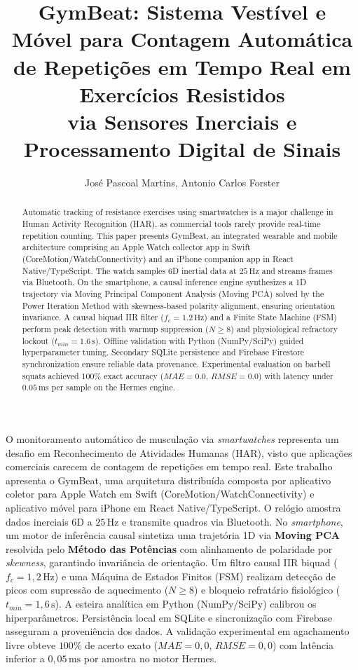 \documentclass[12pt]{article}
\title{GymBeat: Sistema Vestível e Móvel para Contagem Automática de Repetições em Tempo Real em Exercícios Resistidos\\ via Sensores Inerciais e Processamento Digital de Sinais}
\author{José Pascoal Martins\inst{1}, Antonio Carlos Forster\inst{1}}
\begin{document}
\maketitle

\begin{abstract}
Automatic tracking of resistance exercises using smartwatches is a major challenge in Human Activity Recognition (HAR), as commercial tools rarely provide real-time repetition counting. This paper presents GymBeat, an integrated wearable and mobile architecture comprising an Apple Watch collector app in Swift (CoreMotion/WatchConnectivity) and an iPhone companion app in React Native/TypeScript. The watch samples 6D inertial data at $25\,\text{Hz}$ and streams frames via Bluetooth. On the smartphone, a causal inference engine synthesizes a 1D trajectory via Moving Principal Component Analysis (Moving PCA) solved by the Power Iteration Method with skewness-based polarity alignment, ensuring orientation invariance. A causal biquad IIR filter ($f_c = 1.2\,\text{Hz}$) and a Finite State Machine (FSM) perform peak detection with warmup suppression ($N \ge 8$) and physiological refractory lockout ($t_{min} = 1.6\,\text{s}$). Offline validation with Python (NumPy/SciPy) guided hyperparameter tuning. Secondary SQLite persistence and Firebase Firestore synchronization ensure reliable data provenance. Experimental evaluation on barbell squats achieved $100\%$ exact accuracy ($MAE = 0.0$, $RMSE = 0.0$) with latency under $0.05\,\text{ms}$ per sample on the Hermes engine.
\end{abstract}

\begin{resumo}
O monitoramento automático de musculação via \textit{smartwatches} representa um desafio em Reconhecimento de Atividades Humanas (HAR), visto que aplicações comerciais carecem de contagem de repetições em tempo real. Este trabalho apresenta o GymBeat, uma arquitetura distribuída composta por aplicativo coletor para Apple Watch em Swift (CoreMotion/WatchConnectivity) e aplicativo móvel para iPhone em React Native/TypeScript. O relógio amostra dados inerciais 6D a $25\,\text{Hz}$ e transmite quadros via Bluetooth. No \textit{smartphone}, um motor de inferência causal sintetiza uma trajetória 1D via \textbf{Moving PCA} resolvida pelo \textbf{Método das Potências} com alinhamento de polaridade por \textit{skewness}, garantindo invariância de orientação. Um filtro causal IIR biquad ($f_c = 1{,}2\,\text{Hz}$) e uma Máquina de Estados Finitos (FSM) realizam detecção de picos com supressão de aquecimento ($N \ge 8$) e bloqueio refratário fisiológico ($t_{min} = 1{,}6\,\text{s}$). A esteira analítica em Python (NumPy/SciPy) calibrou os hiperparâmetros. Persistência local em SQLite e sincronização com Firebase asseguram a proveniência dos dados. A validação experimental em agachamento livre obteve $100\%$ de acerto exato ($MAE = 0{,}0$, $RMSE = 0{,}0$) com latência inferior a $0{,}05\,\text{ms}$ por amostra no motor Hermes.
\end{resumo}
\end{document}
